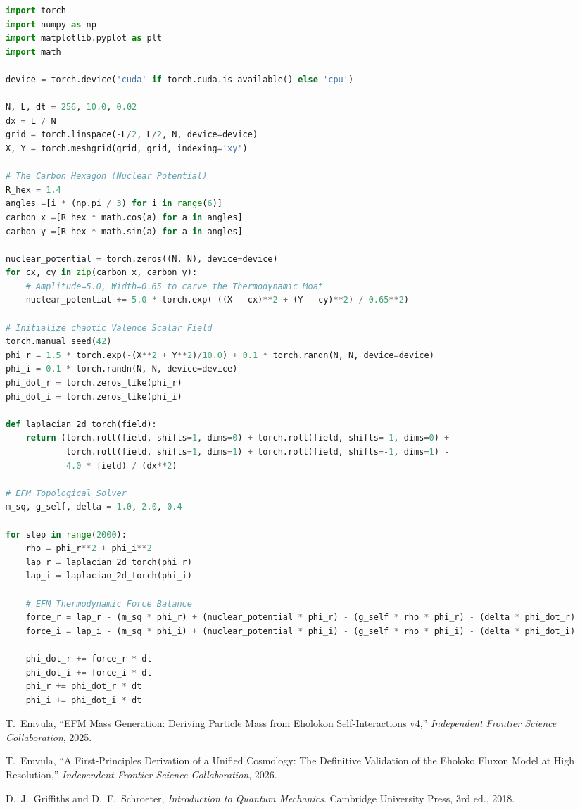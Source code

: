 \documentclass[11pt, twoside]{article}
\begin{document}
\begin{lstlisting}[language=Python, caption=EFM Benzene Aromaticity Solver]
import torch
import numpy as np
import matplotlib.pyplot as plt
import math

device = torch.device('cuda' if torch.cuda.is_available() else 'cpu')

N, L, dt = 256, 10.0, 0.02
dx = L / N
grid = torch.linspace(-L/2, L/2, N, device=device)
X, Y = torch.meshgrid(grid, grid, indexing='xy')

# The Carbon Hexagon (Nuclear Potential)
R_hex = 1.4  
angles =[i * (np.pi / 3) for i in range(6)]
carbon_x =[R_hex * math.cos(a) for a in angles]
carbon_y =[R_hex * math.sin(a) for a in angles]

nuclear_potential = torch.zeros((N, N), device=device)
for cx, cy in zip(carbon_x, carbon_y):
    # Amplitude=5.0, Width=0.65 to carve the Thermodynamic Moat
    nuclear_potential += 5.0 * torch.exp(-((X - cx)**2 + (Y - cy)**2) / 0.65**2)

# Initialize chaotic Valence Scalar Field
torch.manual_seed(42)
phi_r = 1.5 * torch.exp(-(X**2 + Y**2)/10.0) + 0.1 * torch.randn(N, N, device=device)
phi_i = 0.1 * torch.randn(N, N, device=device)
phi_dot_r = torch.zeros_like(phi_r)
phi_dot_i = torch.zeros_like(phi_i)

def laplacian_2d_torch(field):
    return (torch.roll(field, shifts=1, dims=0) + torch.roll(field, shifts=-1, dims=0) +
            torch.roll(field, shifts=1, dims=1) + torch.roll(field, shifts=-1, dims=1) -
            4.0 * field) / (dx**2)

# EFM Topological Solver
m_sq, g_self, delta = 1.0, 2.0, 0.4      

for step in range(2000):
    rho = phi_r**2 + phi_i**2
    lap_r = laplacian_2d_torch(phi_r)
    lap_i = laplacian_2d_torch(phi_i)
    
    # EFM Thermodynamic Force Balance
    force_r = lap_r - (m_sq * phi_r) + (nuclear_potential * phi_r) - (g_self * rho * phi_r) - (delta * phi_dot_r)
    force_i = lap_i - (m_sq * phi_i) + (nuclear_potential * phi_i) - (g_self * rho * phi_i) - (delta * phi_dot_i)
    
    phi_dot_r += force_r * dt
    phi_dot_i += force_i * dt
    phi_r += phi_dot_r * dt
    phi_i += phi_dot_i * dt
\end{lstlisting}


\begin{thebibliography}{4}
\raggedright
{}
T.~Emvula, ``EFM Mass Generation: Deriving Particle Mass from Eholokon Self-Interactions v4,'' \textit{Independent Frontier Science Collaboration}, 2025.

T.~Emvula, ``A First-Principles Derivation of a Unified Cosmology: The Definitive Validation of the Eholoko Fluxon Model at High Resolution,'' \textit{Independent Frontier Science Collaboration}, 2026.

D.~J.~Griffiths and D.~F.~Schroeter, \textit{Introduction to Quantum Mechanics}. Cambridge University Press, 3rd ed., 2018.
\end{thebibliography}
\end{document}
